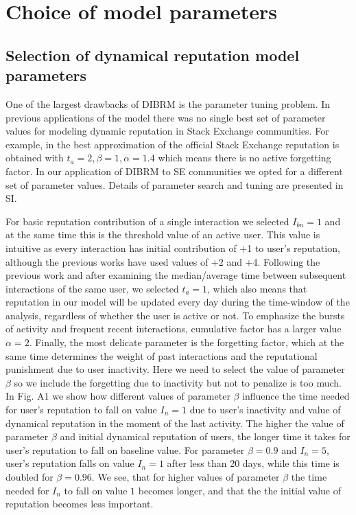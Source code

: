 \chapter{Choice of model parameters}

\section{Selection of dynamical reputation model parameters} \label{section:param}

One of the largest drawbacks of DIBRM is the parameter tuning problem. In previous applications of the model \cite{melnikovDynamicInteractionBasedReputation2018,yashkina2020} there was no single best set of parameter values for modeling dynamic reputation in Stack Exchange communities. For example, in \cite{yashkina2020} the best approximation of the official Stack Exchange reputation is obtained with $t_a =2, \beta = 1, \alpha = 1.4$ which means there is no active forgetting factor. In our application of DIBRM to SE communities we opted for a different set of parameter values. Details of parameter search and tuning are presented in SI.

For basic reputation contribution of a single interaction we selected $I_{bn} = 1$ and at the same time this is the threshold value of an active user. This value is intuitive as every interaction has initial contribution of +1 to user's reputation, although the previous works have used values of +2 and +4. Following the previous work and after examining the median/average time between subsequent interactions of the same user, we selected $t_a = 1$, which also means that reputation in our model will be updated every day during the time-window of the analysis, regardless of whether the user is active or not. To emphasize the bursts of activity and frequent recent interactions, cumulative factor has a larger value $\alpha = 2$. Finally, the most delicate parameter is the forgetting factor, which at the same time determines the weight of past interactions and the reputational punishment due to user inactivity. Here we need to select the value of parameter $\beta$ so we include the forgetting due to inactivity but not to penalize is too much. In Fig. A1 we show how different values of parameter $\beta$ influence the time needed for user's reputation to fall on value $I_{n}=1$ due to user's inactivity and value of dynamical reputation in the moment of the last activity. The higher the value of parameter $\beta$ and initial dynamical reputation of users, the longer time it takes for user's reputation to fall on baseline value. For parameter $\beta=0.9$ and $I_{n}=5$, user's reputation falls on value $I_{n}=1$ after less than 20 days, while this time is doubled for $\beta=0.96$. We see, that for higher values of parameter $\beta$ the time needed for $I_{n}$ to fall on value $1$ becomes longer, and that the the initial value of reputation becomes less important. 

